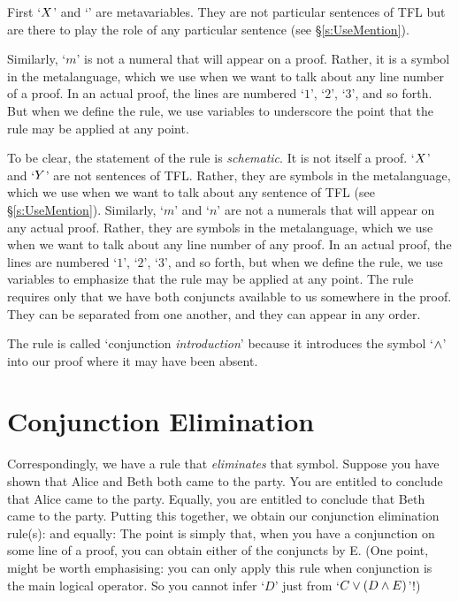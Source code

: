 First `$X$' and `\metaY' are metavariables. They are not particular sentences of TFL but are there to play the role of any particular sentence (see \S\ref{s:UseMention}).




Similarly, `$m$' is not a numeral that will appear on a proof. Rather, it is a symbol in the metalanguage, which we use when we want to talk about any line number of a proof. In an actual proof, the lines are numbered `$1$', `$2$', `$3$', and so forth. But when we define the rule, we use variables to underscore the point that the rule may be applied at any point.


To be clear, the statement of the rule is \emph{schematic}. It is not itself a proof.  `$X$' and `$Y$' are not sentences of TFL. Rather, they are symbols in the metalanguage, which we use when we want to talk about any sentence of TFL (see \S\ref{s:UseMention}). Similarly, `$m$' and `$n$' are not a numerals that will appear on any actual proof. Rather, they are symbols in the metalanguage, which we use when we want to talk about any line number of any proof. In an actual proof, the lines are numbered `$1$', `$2$', `$3$', and so forth, but when we define the rule, we use variables to emphasize that the rule may be applied at any point. The rule requires only that we have both conjuncts available to us somewhere in the proof. They can be separated from one another, and they can appear in any order.

The rule is called `conjunction \emph{introduction}' because it introduces the symbol `$\mathbin{\wedge}$' into our proof where it may have been absent.

\section{Conjunction Elimination}
Correspondingly, we have a rule that \emph{eliminates} that symbol.  Suppose you have shown that Alice and Beth both came to the party. You are entitled to conclude that Alice came to the party. Equally, you are entitled to conclude that Beth came to the party. Putting this together, we obtain our conjunction elimination rule(s):
and equally:
The point is simply that, when you have a conjunction on some line of a proof, you can obtain either of the conjuncts by {\eand}E. (One point, might be worth emphasising: you can only apply this rule when conjunction is the main logical operator. So you cannot infer `$D$' just from `$C \vee (D \mathbin{\wedge} E)$'!)


